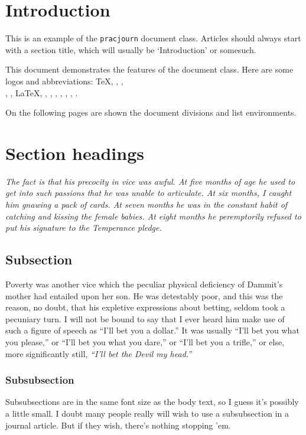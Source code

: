 \section{Introduction}
This is an example of the \texttt{pracjourn} document class.
Articles should always start with a section title, which will usually be `Introduction' or somesuch.

This document demonstrates the features of the document class.
Here are some logos and abbreviations:
\TeX, \pdfTeX, \BibTeX,\\ \MF, \MP, \LaTeX, \LaTeXe,
\mbox{\ConTeXt}, \pdfLaTeX, \XeTeX, \PracTeX, \TPJ, \PS.

On the following pages are shown the document divisions and list environments.

\section{Section headings}
\itshape The fact is that his precocity in vice was awful. At five months of age he
used to get into such passions that he was unable to articulate. At six
months, I caught him gnawing a pack of cards. At seven months he was in
the constant habit of catching and kissing the female babies. At eight
months he peremptorily refused to put his signature to the Temperance
pledge.

\subsection{Subsection}

Poverty was another vice which the peculiar physical deficiency of
Dammit's mother had entailed upon her son. He was detestably poor, and
this was the reason, no doubt, that his expletive expressions about
betting, seldom took a pecuniary turn. I will not be bound to say that I
ever heard him make use of such a figure of speech as ``I'll bet you a
dollar.'' It was usually ``I'll bet you what you please,'' or ``I'll bet you
what you dare,'' or ``I'll bet you a trifle,'' or else, more significantly
still, \emph{``I'll bet the Devil my head.''}

\subsubsection{Subsubsection}


\upshape Subsubsections are in the same font size as the body text, so I guess
it's possibly a little small. I doubt many people really will wish to
use a subsubsection in a journal article. But if they wish, there's
nothing stopping 'em.

